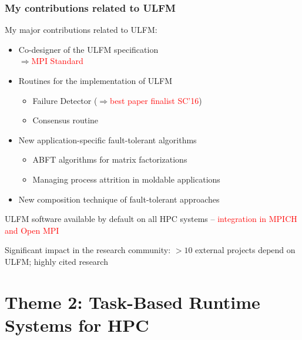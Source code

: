 \begin{frame}
  \frametitle{My contributions related to ULFM}
  
  My major contributions related to ULFM:
  \begin{itemize}
  \item Co-designer of the ULFM specification \\
    $\Longrightarrow$\textcolor{red}{MPI Standard}
  \item Routines for the implementation of ULFM
    \begin{itemize}
    \item Failure Detector ($\Rightarrow$\textcolor{red}{best paper finalist SC'16})
    \item Consensus routine 
    \end{itemize}
  \item New application-specific fault-tolerant algorithms
    \begin{itemize}
    \item ABFT algorithms for matrix factorizations
    \item Managing process attrition in moldable applications
    \end{itemize}
  \item New composition technique of fault-tolerant approaches
  \end{itemize}

  ULFM software available by default on all HPC systems -- \textcolor{red}{integration in MPICH and Open MPI}
  
  Significant impact in the research community: $>10$ external projects depend on ULFM; highly cited research
\end{frame}

\section[Task-Based Runtime Systems for HPC]{Theme 2: Task-Based Runtime Systems for HPC}

